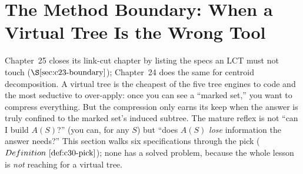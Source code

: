 \section{The Method Boundary: When a Virtual Tree Is the Wrong Tool}\label{sec:c30-boundary}

\begin{previouslybox}
Chapter~25 closes its link-cut chapter by listing the specs an LCT must not touch
(\(\secref{c23-boundary}\)); Chapter~24 does the same for centroid decomposition.  A
virtual tree is the cheapest of the five tree engines to code and the most seductive to
over-apply: once you can see a ``marked set,'' you want to compress everything.  But the
compression only earns its keep when the answer is truly confined to the marked
set's induced subtree.  The mature reflex is not ``can I build \(A(S)\)?'' (you can, for
any \(S\)) but ``does \(A(S)\) \emph{lose} information the answer needs?''  This section
walks six specifications through the pick (\(\defref{c30-pick}\)); none has a solved
problem, because the whole lesson is \emph{not} reaching for a virtual tree.
\end{previouslybox}

